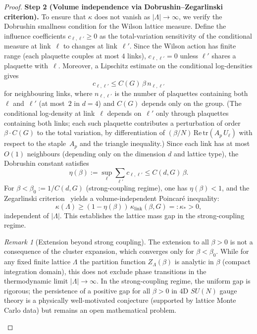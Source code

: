 \documentclass[12pt,a4paper]{article}
\theoremstyle{definition}
\theoremstyle{plain}
\theoremstyle{remark}
\newtheorem{remark}[definition]{Remark}
\begin{document}
\begin{proof}
\medskip
\noindent\textbf{Step 2 (Volume independence via Dobrushin--Zegarlinski criterion).}
To ensure that $\kappa$ does not vanish as $|\Lambda| \to \infty$, we verify the Dobrushin smallness condition for the Wilson lattice measure. Define the influence coefficients $c_{\ell,\ell'} \geq 0$ as the total-variation sensitivity of the conditional measure at link~$\ell$ to changes at link~$\ell'$. Since the Wilson action has finite range (each plaquette couples at most $4$ links), $c_{\ell,\ell'} = 0$ unless $\ell'$ shares a plaquette with~$\ell$. Moreover, a Lipschitz estimate on the conditional log-densities gives
\begin{equation}
    c_{\ell,\ell'} \leq C(G)\,\beta\,n_{\ell,\ell'}
\end{equation}
for neighbouring links, where $n_{\ell,\ell'}$ is the number of plaquettes containing both $\ell$ and~$\ell'$ (at most~$2$ in $d=4$) and $C(G)$ depends only on the group. (The conditional log-density at link~$\ell$ depends on~$\ell'$ only through plaquettes containing both links; each such plaquette contributes a perturbation of order~$\beta\cdot C(G)$ to the total variation, by differentiation of $(\beta/N)\,\mathrm{Re}\,\mathrm{tr}(A_p\,U_\ell)$ with respect to the staple~$A_p$ and the triangle inequality.) Since each link has at most $O(1)$ neighbours (depending only on the dimension $d$ and lattice type), the Dobrushin constant satisfies
\begin{equation}
    \eta(\beta) := \sup_\ell \sum_{\ell'} c_{\ell,\ell'} \leq C(d,G)\,\beta.
\end{equation}
For $\beta < \beta_0 := 1/C(d,G)$ (strong-coupling regime), one has $\eta(\beta) < 1$, and the Zegarlinski criterion~\cite{Zegarlinski1992} yields a volume-independent Poincar\'e inequality:
\begin{equation}
    \kappa(\Lambda) \geq (1 - \eta(\beta))\,\kappa_{\mathrm{link}}(\beta, G) =: \kappa_* > 0,
\end{equation}
independent of $|\Lambda|$. This establishes the lattice mass gap in the strong-coupling regime.

\begin{remark}[Extension beyond strong coupling]\label{rem:all-beta}
The extension to all $\beta > 0$ is not a consequence of the cluster expansion, which converges only for $\beta < \beta_0$. While for any fixed finite lattice $\Lambda$ the partition function $Z_\Lambda(\beta)$ is analytic in $\beta$ (compact integration domain), this does not exclude phase transitions in the thermodynamic limit $|\Lambda| \to \infty$. In the strong-coupling regime, the uniform gap is rigorous; the persistence of a positive gap for all $\beta > 0$ in $4$D $SU(N)$ gauge theory is a physically well-motivated conjecture (supported by lattice Monte Carlo data) but remains an open mathematical problem.
\end{remark}


\end{proof}
\end{document}
